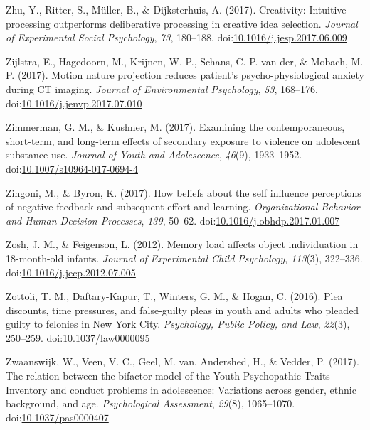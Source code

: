 \documentclass[english,man]{apa6}
\theoremstyle{definition}
\theoremstyle{definition}
\theoremstyle{definition}
\theoremstyle{remark}
\begin{document}
\hypertarget{ref-Zhu2017}{}
Zhu, Y., Ritter, S., Müller, B., \& Dijksterhuis, A. (2017). Creativity:
Intuitive processing outperforms deliberative processing in creative
idea selection. \emph{Journal of Experimental Social Psychology},
\emph{73}, 180--188.
doi:\href{https://doi.org/10.1016/j.jesp.2017.06.009}{10.1016/j.jesp.2017.06.009}

\hypertarget{ref-Zijlstra2017}{}
Zijlstra, E., Hagedoorn, M., Krijnen, W. P., Schans, C. P. van der, \&
Mobach, M. P. (2017). Motion nature projection reduces patient's
psycho-physiological anxiety during CT imaging. \emph{Journal of
Environmental Psychology}, \emph{53}, 168--176.
doi:\href{https://doi.org/10.1016/j.jenvp.2017.07.010}{10.1016/j.jenvp.2017.07.010}

\hypertarget{ref-Zimmerman2017}{}
Zimmerman, G. M., \& Kushner, M. (2017). Examining the contemporaneous,
short-term, and long-term effects of secondary exposure to violence on
adolescent substance use. \emph{Journal of Youth and Adolescence},
\emph{46}(9), 1933--1952.
doi:\href{https://doi.org/10.1007/s10964-017-0694-4}{10.1007/s10964-017-0694-4}

\hypertarget{ref-Zingoni2017}{}
Zingoni, M., \& Byron, K. (2017). How beliefs about the self influence
perceptions of negative feedback and subsequent effort and learning.
\emph{Organizational Behavior and Human Decision Processes}, \emph{139},
50--62.
doi:\href{https://doi.org/10.1016/j.obhdp.2017.01.007}{10.1016/j.obhdp.2017.01.007}

\hypertarget{ref-Zosh2012}{}
Zosh, J. M., \& Feigenson, L. (2012). Memory load affects object
individuation in 18-month-old infants. \emph{Journal of Experimental
Child Psychology}, \emph{113}(3), 322--336.
doi:\href{https://doi.org/10.1016/j.jecp.2012.07.005}{10.1016/j.jecp.2012.07.005}

\hypertarget{ref-Zottoli2016}{}
Zottoli, T. M., Daftary-Kapur, T., Winters, G. M., \& Hogan, C. (2016).
Plea discounts, time pressures, and false-guilty pleas in youth and
adults who pleaded guilty to felonies in New York City.
\emph{Psychology, Public Policy, and Law}, \emph{22}(3), 250--259.
doi:\href{https://doi.org/10.1037/law0000095}{10.1037/law0000095}

\hypertarget{ref-Zwaanswijk2016}{}
Zwaanswijk, W., Veen, V. C., Geel, M. van, Andershed, H., \& Vedder, P.
(2017). The relation between the bifactor model of the Youth
Psychopathic Traits Inventory and conduct problems in adolescence:
Variations across gender, ethnic background, and age.
\emph{Psychological Assessment}, \emph{29}(8), 1065--1070.
doi:\href{https://doi.org/10.1037/pas0000407}{10.1037/pas0000407}
\end{document}
